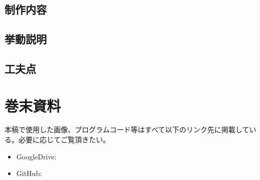 \documentclass[dvipdfmx]{jsarticle}
\begin{document}
\subsection{制作内容}
\subsection{挙動説明}
\subsection{工夫点}
\section{巻末資料}
本稿で使用した画像、プログラムコード等はすべて以下のリンク先に掲載している。必要に応じてご覧頂きたい。
\begin{itemize}
  \item GoogleDrive:\url{}
  \item GitHub:\url{}
\end{itemize}
\end{document}
